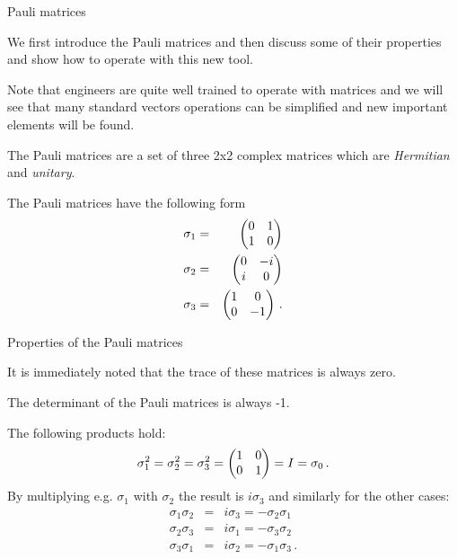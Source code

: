 \documentclass[10pt]{beamer}
\begin{document}
\begin{frame}[fragile]{Pauli matrices}



We first introduce the Pauli matrices and then discuss some of their properties and show how to operate with this new tool.

Note that engineers are quite well trained to operate with matrices and we will see that many standard vectors operations can be simplified and new important elements will be found.

 The Pauli matrices are a set of three 2x2 complex matrices which are \emph{Hermitian} and \emph{unitary}. 
 
  The Pauli matrices have the following form
%
\begin{eqnarray}
\sigma_1 &= & \begin{pmatrix}0 & 1\cr 1 & 0\end{pmatrix} \nonumber \\
%
\sigma_2 &= & \begin{pmatrix}0 & -i\cr i & 0\end{pmatrix} \nonumber \\
%
\sigma_3 &= &\begin{pmatrix}1 & 0\cr 0 & -1\end{pmatrix}  \, .
%
\end{eqnarray}
%

\end{frame}

\begin{frame}[fragile]{Properties of the Pauli matrices}

It is immediately noted that the trace of these matrices is always zero. 

The determinant of the Pauli matrices is always -1.

The following products hold: 
%
\begin {equation}
\sigma_1^2 = \sigma_2^2 = \sigma_3^2 =  \begin{pmatrix}1 & 0\cr 0 & 1\end{pmatrix} = I = \sigma_0\,.
 \end{equation}
By multiplying e.g. $\sigma_1$ with $\sigma_2$ the result is $i \sigma_3$ and similarly for the other cases:
%
\begin {eqnarray}
\sigma_1 \sigma_2 &=& i \sigma_3  = - \sigma_2 \sigma_1 \nonumber \\
\sigma_2 \sigma_3 &=& i \sigma_1 =  - \sigma_3  \sigma_2\nonumber \\
\sigma_3 \sigma_1 &=&  i \sigma_2 =  - \sigma_1  \sigma_3 \,.
\label{sigmacomb}
 \end{eqnarray}

\end{frame}
\end{document}
